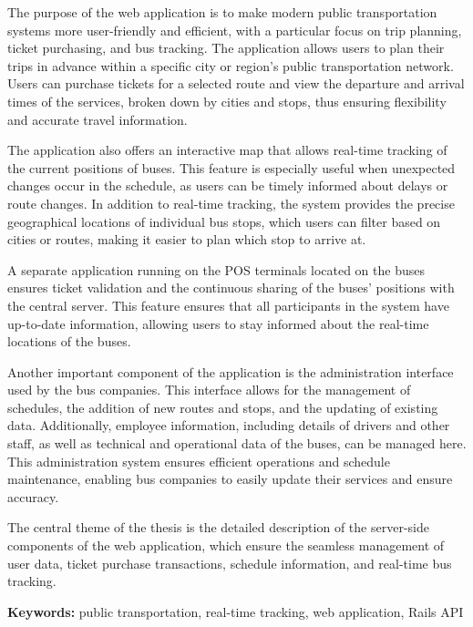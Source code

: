 
The purpose of the web application is to make modern public transportation systems more user-friendly and efficient, with a particular focus on trip planning, ticket purchasing, and bus tracking. The application allows users to plan their trips in advance within a specific city or region's public transportation network. Users can purchase tickets for a selected route and view the departure and arrival times of the services, broken down by cities and stops, thus ensuring flexibility and accurate travel information.

The application also offers an interactive map that allows real-time tracking of the current positions of buses. This feature is especially useful when unexpected changes occur in the schedule, as users can be timely informed about delays or route changes. In addition to real-time tracking, the system provides the precise geographical locations of individual bus stops, which users can filter based on cities or routes, making it easier to plan which stop to arrive at.

A separate application running on the POS terminals located on the buses ensures ticket validation and the continuous sharing of the buses' positions with the central server. This feature ensures that all participants in the system have up-to-date information, allowing users to stay informed about the real-time locations of the buses.

Another important component of the application is the administration interface used by the bus companies. This interface allows for the management of schedules, the addition of new routes and stops, and the updating of existing data. Additionally, employee information, including details of drivers and other staff, as well as technical and operational data of the buses, can be managed here. This administration system ensures efficient operations and schedule maintenance, enabling bus companies to easily update their services and ensure accuracy.

The central theme of the thesis is the detailed description of the server-side components of the web application, which ensure the seamless management of user data, ticket purchase transactions, schedule information, and real-time bus tracking.

\vspace{1em}
\textbf{Keywords:} public transportation, real-time tracking, web application, Rails API
